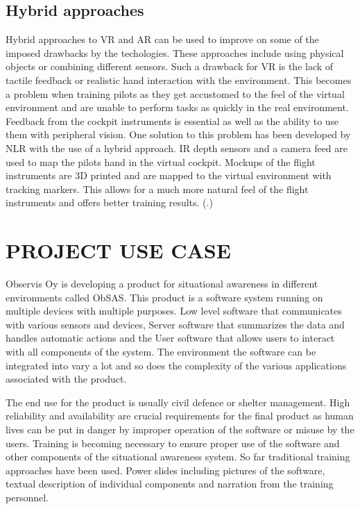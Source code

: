 \documentclass[12pt, a4paper,oneside, nocenter]{thesis}
\renewcommand{\citep}[1]{(\citealp{#1}.)}
\begin{document}
\section{Hybrid approaches}
\par
Hybrid approaches to VR and AR can be used to improve on some of the imposed drawbacks by the techologies. These approaches include using physical objects or combining different sensors.
Such a drawback for VR is the lack of tactile feedback or realistic hand interaction with the environment. This becomes a problem when training pilots as they get accustomed to the feel of the virtual environment and are unable to perform tasks as quickly in the real environment.
Feedback from the cockpit instruments is essential as well as the ability to use them with peripheral vision.
One solution to this problem has been developed by NLR with the use of a hybrid approach.
IR depth sensors and a camera feed are used to map the pilots hand in the virtual cockpit. Mockups of the flight instruments are 3D printed and are mapped to the virtual environment with tracking markers.
This allows for a much more natural feel of the flight instruments and offers better training results. \citep{nlr-vr}
\\
\chapter{\MakeUppercase{Project use case}}
Observis Oy is developing a product for situational awareness in different environments called ObSAS.
This product is a software system running on multiple devices with multiple purposes.
Low level software that communicates with various sensors and devices, Server software
that summarizes the data and handles automatic actions and the User software that allows users to interact
with all components of the system. The environment the software can be integrated 
into vary a lot and so does 
the complexity of the various applications associated with the product.
\par
The end use for the product is usually civil defence or shelter management.
High reliability and availability are crucial requirements for the final product as 
human lives can be put in danger by improper operation of the software or misuse by
the users. Training is becoming necessary to ensure proper use of the software and 
other components of the situational awareness system. So far traditional training 
approaches have been used. Power slides including pictures of the software, textual description of individual components and narration from the training personnel.
\par
\end{document}
